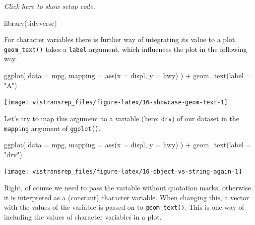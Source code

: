 \documentclass[]{book}
\newenvironment{Shaded}{}{}
\newcommand{\DataTypeTok}[1]{#1}
\newcommand{\KeywordTok}[1]{\textcolor[rgb]{0.00,0.00,1.00}{#1}}
\newcommand{\NormalTok}[1]{#1}
\newcommand{\OperatorTok}[1]{#1}
\newcommand{\StringTok}[1]{\textcolor[rgb]{0.00,0.50,0.50}{#1}}
\begin{document}
\emph{Click here to show setup code.}

\begin{Shaded}
\begin{Highlighting}[]
\KeywordTok{library}\NormalTok{(tidyverse)}
\end{Highlighting}
\end{Shaded}

For character variables there is further way of integrating its value to a plot.
\texttt{geom\_text()} takes a \texttt{label} argument, which influences the plot in the following way.

\begin{Shaded}
\begin{Highlighting}[]
\KeywordTok{ggplot}\NormalTok{(}
  \DataTypeTok{data =}\NormalTok{ mpg,}
  \DataTypeTok{mapping =} \KeywordTok{aes}\NormalTok{(}\DataTypeTok{x =}\NormalTok{ displ, }\DataTypeTok{y =}\NormalTok{ hwy)}
\NormalTok{) }\OperatorTok{+}
\StringTok{  }\KeywordTok{geom_text}\NormalTok{(}\DataTypeTok{label =} \StringTok{"A"}\NormalTok{)}
\end{Highlighting}
\end{Shaded}

\begin{flushright}\texttt{[image: vistransrep\_files/figure-latex/16-showcase-geom-text-1]} \end{flushright}

Let's try to map this argument to a variable (here: \texttt{drv}) of our dataset in the \texttt{mapping} argument of \texttt{ggplot()}.

\begin{Shaded}
\begin{Highlighting}[]
\KeywordTok{ggplot}\NormalTok{(}
  \DataTypeTok{data =}\NormalTok{ mpg,}
  \DataTypeTok{mapping =} \KeywordTok{aes}\NormalTok{(}\DataTypeTok{x =}\NormalTok{ displ, }\DataTypeTok{y =}\NormalTok{ hwy)}
\NormalTok{) }\OperatorTok{+}
\StringTok{  }\KeywordTok{geom_text}\NormalTok{(}\DataTypeTok{label =} \StringTok{"drv"}\NormalTok{)}
\end{Highlighting}
\end{Shaded}

\begin{flushright}\texttt{[image: vistransrep\_files/figure-latex/16-object-vs-string-again-1]} \end{flushright}

Right, of course we need to pass the variable without quotation marks, otherwise it is interpreted as a (constant) character variable.
When changing this, a vector with the values of the variable is passed on to \texttt{geom\_text()}.
This is one way of including the values of character variables in a plot.
\end{document}

